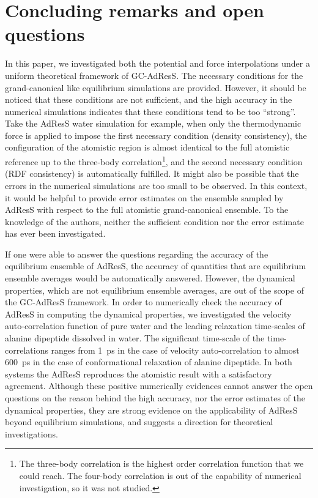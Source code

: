 \documentclass[epjST]{svjour}
\begin{document}




\section{Concluding remarks and open questions}
\label{sec:conclusion}

In this paper, we investigated both the potential and force
interpolations under a uniform theoretical framework of GC-AdResS. The
necessary conditions for the grand-canonical like equilibrium
simulations are provided. However, it should be noticed that these
conditions are not sufficient, and the high accuracy in the  numerical simulations indicates
that these conditions tend to be too ``strong''.  Take the AdResS
water simulation for example, when only the thermodynamic force is
applied to impose the first necessary condition (density consistency),
the configuration of the atomistic region is almost identical to the
full atomistic reference up to the three-body
correlation\footnote{
  The three-body correlation is the highest order correlation function that we could reach.
  The four-body correlation is out of the capability of numerical
investigation, so it was not studied.}, and the second necessary condition (RDF consistency)
is automatically fulfilled.
It might also be possible that the errors in the numerical simulations are too
small to be observed.  In this context, it would be helpful
to provide error estimates on the ensemble  sampled by AdResS with respect to the full atomistic
grand-canonical ensemble.
To the knowledge of the authors,
neither the sufficient condition nor the error estimate has ever been investigated.

If one were able to answer the questions regarding the accuracy of the equilibrium
ensemble of AdResS, the accuracy of quantities that are equilibrium ensemble
averages would be automatically answered. However, the dynamical properties, which are
not equilibrium ensemble averages, are out of the scope of the 
GC-AdResS framework. In order to numerically check the accuracy of AdResS
in computing the dynamical properties, we investigated the velocity auto-correlation
function of pure water and the leading relaxation time-scales of alanine dipeptide
dissolved in water.
The significant time-scale of the time-correlations ranges from 1~ps in the case of velocity auto-correlation
to almost 600~ps in the case of conformational relaxation of alanine dipeptide.
In both systems the AdResS reproduces the atomistic result
with a satisfactory agreement.
Although these positive numerically evidences cannot answer the open questions
on the reason behind the high accuracy, nor the error estimates of the dynamical properties,
they are strong evidence on the applicability of AdResS beyond equilibrium simulations,
and suggests a direction for theoretical investigations.
\end{document}
